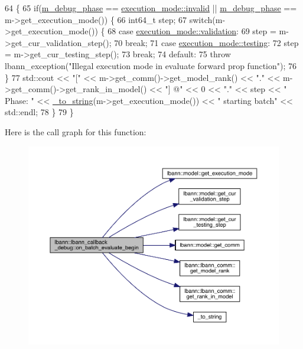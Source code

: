\begin{DoxyCode}
64                                                                 \{
65   \textcolor{keywordflow}{if}(\hyperlink{classlbann_1_1lbann__callback__debug_acc66ab699534e42aa958148f1fb3fd6f}{m\_debug\_phase} == \hyperlink{base_8hpp_a2781a159088df64ed7d47cc91c4dc0a8afedb2d84cafe20862cb4399751a8a7e3}{execution\_mode::invalid} || 
      \hyperlink{classlbann_1_1lbann__callback__debug_acc66ab699534e42aa958148f1fb3fd6f}{m\_debug\_phase} == m->get\_execution\_mode()) \{
66     int64\_t step;
67     \textcolor{keywordflow}{switch}(m->get\_execution\_mode()) \{
68     \textcolor{keywordflow}{case} \hyperlink{base_8hpp_a2781a159088df64ed7d47cc91c4dc0a8aa617908b172c473cb8e8cda059e55bf0}{execution\_mode::validation}:
69       step = m->get\_cur\_validation\_step();
70       \textcolor{keywordflow}{break};
71     \textcolor{keywordflow}{case} \hyperlink{base_8hpp_a2781a159088df64ed7d47cc91c4dc0a8aae2b1fca515949e5d54fb22b8ed95575}{execution\_mode::testing}:
72       step = m->get\_cur\_testing\_step();
73       \textcolor{keywordflow}{break};
74     \textcolor{keywordflow}{default}:
75       \textcolor{keywordflow}{throw} lbann\_exception(\textcolor{stringliteral}{"Illegal execution mode in evaluate forward prop function"});
76     \}
77     std::cout << \textcolor{stringliteral}{"["} << m->get\_comm()->get\_model\_rank() << \textcolor{stringliteral}{"."} << m->get\_comm()->get\_rank\_in\_model() << \textcolor{stringliteral}{"]
       @"} << 0 << \textcolor{stringliteral}{"."} << step << \textcolor{stringliteral}{" Phase: "} << \hyperlink{base_8hpp_adeeaddd10bd31df0cae7cb0fcae45d5c}{\_to\_string}(m->get\_execution\_mode()) << \textcolor{stringliteral}{" starting batch"} 
      << std::endl;
78   \}
79 \}
\end{DoxyCode}
Here is the call graph for this function\+:\nopagebreak
\begin{figure}[H]
\begin{center}
\leavevmode
\includegraphics[width=350pt]{classlbann_1_1lbann__callback__debug_ac364fb6e77dc163e146af77bb670d74b_cgraph}
\end{center}
\end{figure}
